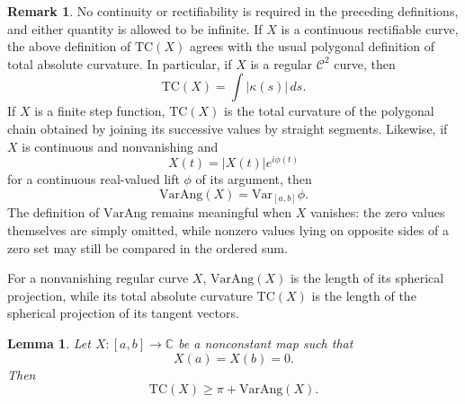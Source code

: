 \documentclass[reqno]{amsart}
\newtheorem{lemma}[theorem]{Lemma}
\theoremstyle{definition}
\newtheorem{remark}[theorem]{Remark}
\newcommand{\T}{\mathrm{TC}}
\newcommand{\VA}{\mathrm{VarAng}}
\newcommand{\V}{\mathrm{Var}}
\newcommand{\cC}{\mathcal{C}}
\numberwithin{equation}{section}
\begin{document}
\begin{remark}\label{R1}
No continuity or rectifiability is required in the preceding definitions, and either quantity is allowed to be infinite. If $X$ is a continuous rectifiable curve, the above definition of $\T(X)$ agrees with the usual polygonal definition of total absolute curvature.  In particular, if $X$ is a regular $\cC^2$ curve, then
\[\T(X)=\int |\kappa(s)|\,ds.\]
If $X$ is a finite step function, $\T(X)$ is the total curvature of the polygonal chain obtained by joining its successive values by straight segments. Likewise, if $X$ is continuous and nonvanishing and
\[X(t)=|X(t)|e^{i\phi(t)}\]
for a continuous real-valued lift $\phi$ of its argument, then
\[\VA(X)=\V_{[a,b]}\phi.
\]
The definition of $\VA$ remains meaningful when
$X$ vanishes: the zero values themselves are simply omitted, while
nonzero values lying on opposite sides of a zero set may still be
compared in the ordered sum.

For a nonvanishing regular curve $X$, $\VA(X)$ is the length of its spherical projection, while its total absolute curvature $\T(X)$ is the length of the spherical projection of its tangent vectors.
\end{remark}

\begin{lemma}\label{L1} Let $X:[a,b]\to\mathbb C$ be a nonconstant map such that
\[X(a)=X(b)=0.\]
Then
\[\T(X)\ge\pi+\VA(X).\]
\end{lemma}
\end{document}

